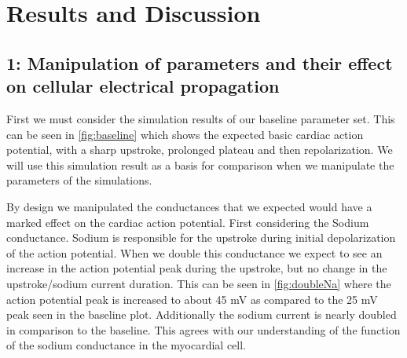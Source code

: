 \documentclass[12pt]{article}
\begin{document}
\section{Results and Discussion}
\subsection{1: Manipulation of parameters and their effect on cellular electrical  propagation}
\par{}
First we must consider the simulation results of our baseline parameter set. This can be seen in \ref{fig:baseline} which shows the expected basic cardiac action potential, with a sharp upstroke, prolonged plateau and then repolarization. We will use this simulation result as a basis for comparison when we manipulate the parameters of the simulations.
\par{}
By design we manipulated the conductances that we expected would have a marked effect on the cardiac action potential. First considering the Sodium conductance. Sodium is responsible for the upstroke during initial depolarization of the action potential. When we double this conductance we expect to see an increase in the action potential peak during the upstroke, but no change in the upstroke/sodium current duration. This can be seen in \ref{fig:doubleNa} where the action potential peak is increased to about 45 mV as compared to the 25 mV peak seen in the baseline plot. Additionally the sodium current is nearly doubled in comparison to the baseline. This agrees with our understanding of the function of the sodium conductance in the myocardial cell. 
\end{document}
